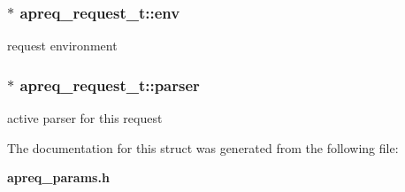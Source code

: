 \subsubsection{$\ast$ apreq\_\-request\_\-t::env}\label{structapreq__request__t_m3}


request environment 
\subsubsection{$\ast$ apreq\_\-request\_\-t::parser}\label{structapreq__request__t_m2}


active parser for this request 

The documentation for this struct was generated from the following file:\begin{CompactItemize}
\item 
{\bf apreq\_\-params.h}\end{CompactItemize}
